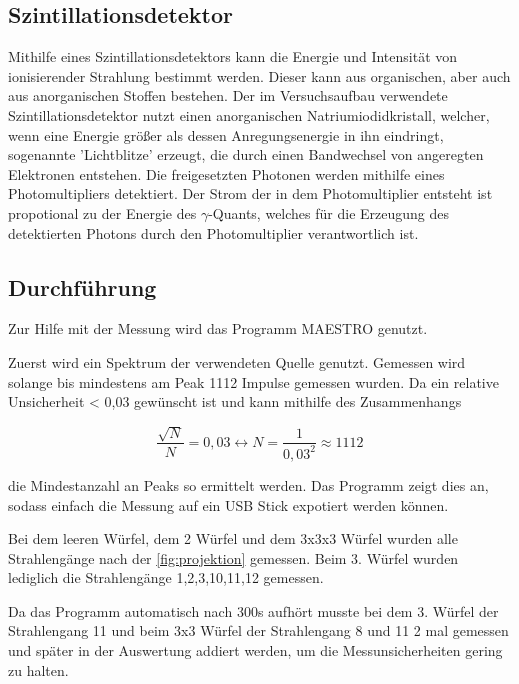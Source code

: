 \subsection{Szintillationsdetektor}
Mithilfe eines Szintillationsdetektors kann die Energie und Intensität von ionisierender Strahlung bestimmt werden. Dieser kann aus organischen, aber auch aus anorganischen Stoffen
bestehen. Der im Versuchsaufbau verwendete Szintillationsdetektor nutzt einen anorganischen Natriumiodidkristall, welcher, wenn eine Energie größer als dessen Anregungsenergie
 in ihn eindringt, sogenannte 'Lichtblitze' erzeugt, die durch einen Bandwechsel von angeregten Elektronen entstehen. Die freigesetzten Photonen werden mithilfe eines 
Photomultipliers detektiert. Der Strom der in dem Photomultiplier entsteht ist propotional zu der Energie des $\gamma$-Quants, welches für die Erzeugung des detektierten Photons
durch den Photomultiplier verantwortlich ist. 


\subsection{Durchführung}
Zur Hilfe mit der Messung wird das Programm MAESTRO genutzt.

\noindent
Zuerst wird ein Spektrum der verwendeten Quelle genutzt. Gemessen wird solange bis mindestens am Peak 1112 Impulse gemessen wurden. Da ein relative Unsicherheit < 0,03
gewünscht ist und kann mithilfe des Zusammenhangs

\begin{equation}
    \frac{\sqrt{N}}{N} = 0,03 \leftrightarrow N = \frac{1}{0,03^2} \approx 1112
    \label{eqn:n}
  \end{equation}
  
die Mindestanzahl an Peaks so ermittelt werden. Das Programm zeigt dies an, sodass einfach die Messung auf ein USB Stick expotiert werden können.

\noindent
Bei dem leeren Würfel, dem 2 Würfel und dem 3x3x3 Würfel wurden alle Strahlengänge nach der \autoref{fig:projektion} gemessen. Beim 3. Würfel wurden lediglich die Strahlengänge
1,2,3,10,11,12 gemessen. 

\noindent
Da das Programm automatisch nach 300s aufhört musste bei dem 3. Würfel der Strahlengang 11 und beim 3x3 Würfel der Strahlengang 8 und 11 2 mal gemessen und später in der
Auswertung addiert werden, um die Messunsicherheiten gering zu halten.












